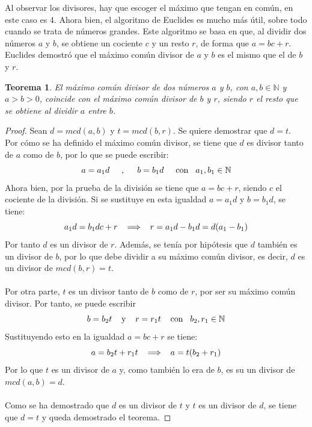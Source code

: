 \documentclass[a4paper, openright, 11pt, titlepage]{report}
\newtheorem{teor}[propo]{Teorema}
\theoremstyle{definition}\newtheorem{defin}[propo]{Definition}
\theoremstyle{definition}\newtheorem{obser}[propo]{Remark}
\theoremstyle{definition}\newtheorem{ejem}[propo]{Ejemplo}
\theoremstyle{definition}\newtheorem{algoritmo}[propo]{Algoritmo}
\begin{document}
Al observar los divisores, hay que escoger el máximo que tengan en común, en este caso es 4. 
Ahora bien, el algoritmo de Euclides es mucho más útil, sobre todo cuando se trata de números grandes. Este algoritmo se basa en que, al dividir dos números $a$ y $b$, se obtiene un cociente $c$ y un resto $r$, de forma que $a = bc + r$. Euclides demostró que el máximo común divisor de $a$ y $b$ es el mismo que el de $b$ y $r$. 
\begin{teor}
El máximo común divisor de dos números $a$ y $b$, con $a, b \in \mathbb{N}$ y $a>b>0$, coincide con el máximo común divisor de $b$ y $r$, siendo $r$ el resto que se obtiene al dividir $a$ entre $b$.
\end{teor}
\begin{proof}
Sean $d = mcd(a,b)$ y $t = mcd(b,r)$. Se quiere demostrar que $d = t$.\\
Por cómo se ha definido el máximo común divisor, se tiene que $d$ es divisor tanto de $a$ como de $b$, por lo que se puede escribir:
$$a = a_{1}d \hspace{0.5cm}, \hspace{0.5cm} b = b_{1}d \hspace{0.5cm} \text{con} \hspace{0.3cm} a_{1},b_{1} \in \mathbb{N}$$
Ahora bien, por la prueba de la división se tiene que $a = bc + r$, siendo $c$ el cociente de la división. Si se sustituye en esta igualdad $a = a_{1}d$ y $b = b_{1}d$, se tiene: 
$$a_{1}d = b_{1}dc + r \hspace{0.3cm}\Longrightarrow\hspace{0.3cm} r = a_{1}d - b_{1}d = d(a_{1} - b_{1})$$
Por tanto $d$ es un divisor de $r$. Además, se tenía por hipótesis que $d$ también es un divisor de $b$, por lo que debe dividir a su máximo común divisor, es decir, $d$ es un divisor de $mcd(b,r) = t$.\\\\
Por otra parte, $t$ es un divisor tanto de $b$ como de $r$, por ser su máximo común divisor. Por tanto, se puede escribir 
$$b = b_{2}t \hspace{0.4cm} \text{y} \hspace{0.4cm} r = r_{1}t \hspace{0.4cm} \text{con} \hspace{0.3cm} b_{2},r_{1} \in \mathbb{N}$$ Sustituyendo esto en la igualdad $a = bc + r$ se tiene:
$$a = b_{2}t + r_{1}t \hspace{0.3cm} \Longrightarrow \hspace{0.3cm} a = t(b_{2}+r_{1})$$
Por lo que $t$ es un divisor de $a$ y, como también lo era de $b$, es su un divisor de $mcd(a,b) = d$.\\\\
Como se ha demostrado que $d$ es un divisor de $t$ y $t$ es un divisor de $d$, se tiene que $d = t$ y queda demostrado el teorema.
\end{proof}
\end{document}
